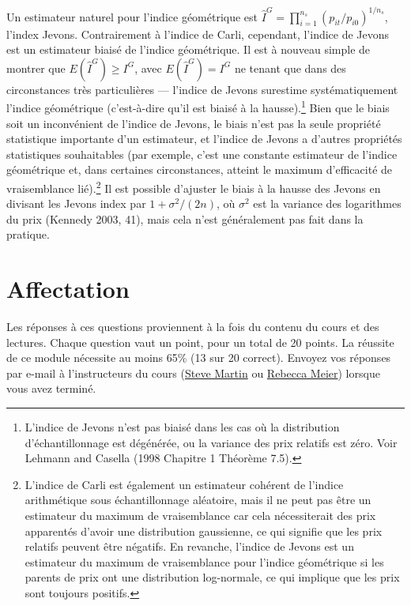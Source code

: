 \documentclass[]{article}
\begin{document}
Un estimateur naturel pour l'indice géométrique est \(\hat{I}^{G} = \prod_{i = 1}^{n_{s}} (p_{it} / p_{i0})^{1 / n_{s}}\), l'index Jevons. Contrairement à l'indice de Carli, cependant, l'indice de Jevons est un estimateur biaisé de l'indice géométrique. Il est à nouveau simple de montrer que \(E(\hat{I}^{G}) \geq I^{G}\), avec \(E(\hat{I}^{G}) = I^{G}\) ne tenant que dans des circonstances très particulières --- l'indice de Jevons surestime systématiquement l'indice géométrique (c'est-à-dire qu'il est biaisé à la hausse).\footnote{L'indice de Jevons n'est pas biaisé dans les cas où la distribution d'échantillonnage est dégénérée, ou la variance des prix relatifs est zéro. Voir Lehmann and Casella (1998 Chapitre 1 Théorème 7.5).} Bien que le biais soit un inconvénient de l'indice de Jevons, le biais n'est pas la seule propriété statistique importante d'un estimateur, et l'indice de Jevons a d'autres propriétés statistiques souhaitables (par exemple, c'est une constante estimateur de l'indice géométrique et, dans certaines circonstances, atteint le maximum d'efficacité de vraisemblance lié).\footnote{L'indice de Carli est également un estimateur cohérent de l'indice arithmétique sous échantillonnage aléatoire, mais il ne peut pas être un estimateur du maximum de vraisemblance car cela nécessiterait des prix apparentés d'avoir une distribution gaussienne, ce qui signifie que les prix relatifs peuvent être négatifs. En revanche, l'indice de Jevons est un estimateur du maximum de vraisemblance pour l'indice géométrique si les parents de prix ont une distribution log-normale, ce qui implique que les prix sont toujours positifs.} Il est possible d'ajuster le biais à la hausse des Jevons en divisant les Jevons index par \(1 + \sigma^{2} / (2n)\), où \(\sigma^{2}\) est la variance des logarithmes du prix (Kennedy 2003, 41), mais cela n'est généralement pas fait dans la pratique.

\hypertarget{affectation-1}{%
\section{Affectation}\label{affectation-1}}

Les réponses à ces questions proviennent à la fois du contenu du cours et des lectures. Chaque question vaut un point, pour un total de 20 points. La réussite de ce module nécessite au moins 65\% (13 sur 20 correct). Envoyez vos réponses par e-mail à l'instructeurs du cours (\href{mailto:steve.martin5@canada.ca}{Steve Martin} ou \href{mailto:rebecca.meier@canada.ca}{Rebecca Meier}) lorsque vous avez terminé.
\end{document}
